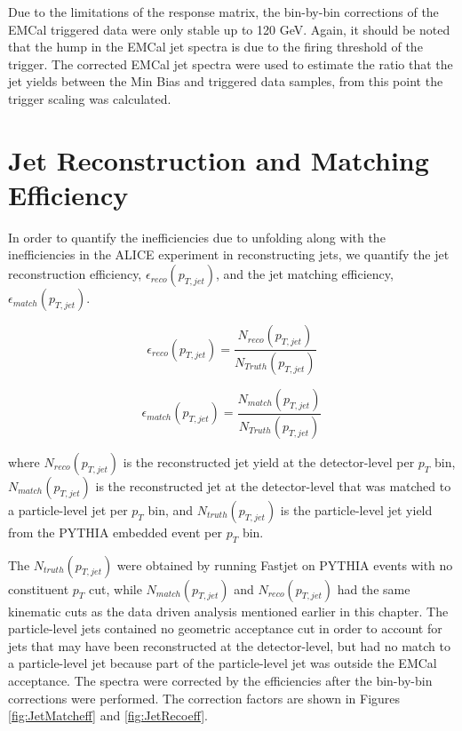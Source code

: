 Due to the limitations of the response matrix, the bin-by-bin corrections of the EMCal triggered data were only stable up to 120 GeV.  Again, it should be noted that the hump in the EMCal jet spectra is due to the firing threshold of the trigger.  The corrected EMCal jet spectra were used to estimate the ratio that the jet yields between the Min Bias and triggered data samples, from this point the trigger scaling was calculated.  

\section{Jet Reconstruction and Matching Efficiency}
In order to quantify the inefficiencies due to unfolding along with the inefficiencies in the ALICE experiment in reconstructing jets, we quantify the jet reconstruction efficiency, $\epsilon_{reco} (p_{T, jet})$, and the jet matching efficiency, $\epsilon_{match} (p_{T, jet})$.

\begin{equation}
 \epsilon_{reco} (p_{T, jet}) = \frac{N_{reco}(p_{T, jet}) }{N_{Truth} (p_{T, jet})}
\label{eq:jetrecoeff}
\end{equation}

\begin{equation}
 \epsilon_{match} (p_{T, jet}) = \frac{N_{match}(p_{T, jet}) }{N_{Truth}(p_{T, jet})}
\label{eq:jetmatchoeff}
\end{equation}

\noindent 
where $N_{reco} (p_{T, jet})$ is the reconstructed jet yield at the detector-level per $p_{T}$ bin, $N_{match}(p_{T, jet})$ is the reconstructed jet at the detector-level that was matched to a particle-level jet per $p_{T}$ bin, and $N_{truth} (p_{T, jet})$ is the particle-level jet yield from the PYTHIA embedded event per $p_{T}$ bin.  

The $N_{truth} (p_{T, jet})$ were obtained by running Fastjet on PYTHIA events with no constituent $p_{T}$ cut, while $N_{match}(p_{T, jet})$ and $N_{reco} (p_{T, jet})$ had the same kinematic cuts as the data driven analysis mentioned earlier in this chapter.  The particle-level jets contained no geometric acceptance cut in order to account for jets that may have been reconstructed at the detector-level, but had no match to a particle-level jet because part of the particle-level jet was outside the EMCal acceptance.  The spectra were corrected by the efficiencies after the bin-by-bin corrections were performed.  The correction factors are shown in Figures \ref{fig:JetMatcheff} and \ref{fig:JetRecoeff}.

